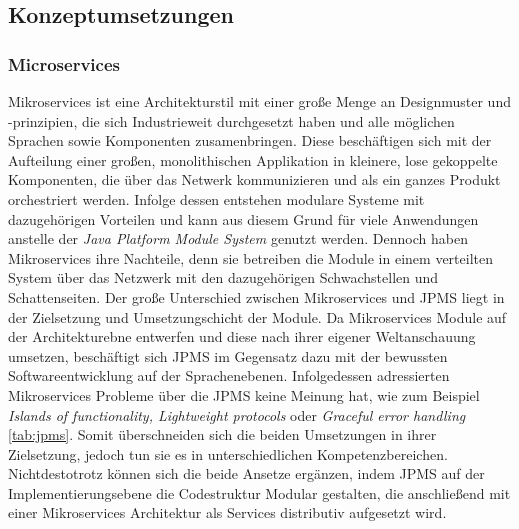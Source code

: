 \subsection{Konzeptumsetzungen}

\subsubsection{Microservices}
  Mikroservices ist eine Architekturstil mit einer große Menge an Designmuster und -prinzipien, die sich Industrieweit durchgesetzt haben und alle möglichen Sprachen sowie Komponenten zusamenbringen. 
  Diese beschäftigen sich mit der Aufteilung einer großen, monolithischen Applikation in kleinere, lose gekoppelte Komponenten, die über das Netwerk kommunizieren und als ein ganzes Produkt orchestriert werden.
  Infolge dessen entstehen modulare Systeme mit dazugehörigen Vorteilen und kann aus diesem Grund für viele Anwendungen anstelle der \textit{Java Platform Module System} genutzt werden.
  Dennoch haben Mikroservices ihre Nachteile, denn sie betreiben die Module in einem verteilten System über das Netzwerk mit den dazugehörigen Schwachstellen und Schattenseiten.
  \bigbreak Der große Unterschied zwischen Mikroservices und JPMS liegt in der Zielsetzung und Umsetzungschicht der Module. 
  Da Mikroservices Module auf der Architekturebne entwerfen und diese nach ihrer eigener Weltanschauung umsetzen, beschäftigt sich JPMS im Gegensatz dazu mit der bewussten Softwareentwicklung auf der Sprachenebenen.
  Infolgedessen adressierten Mikroservices Probleme über die JPMS keine Meinung hat, wie zum Beispiel \textit{Islands of functionality, Lightweight protocols} oder \textit{Graceful error handling} \ref{tab:jpms}. Somit überschneiden sich die beiden Umsetzungen in ihrer Zielsetzung, jedoch tun sie es in unterschiedlichen Kompetenzbereichen.  
  \bigbreak Nichtdestotrotz können sich die beide Ansetze ergänzen, indem JPMS auf der Implementierungsebene die Codestruktur Modular gestalten, die anschließend mit einer Mikroservices Architektur als Services distributiv aufgesetzt wird. 

